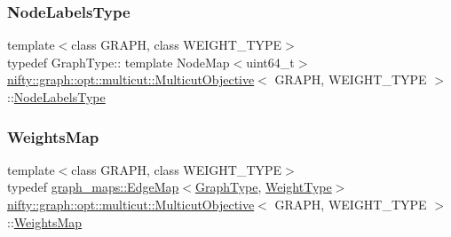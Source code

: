 \subsubsection{\texorpdfstring{Node\+Labels\+Type}{NodeLabelsType}}
{\footnotesize\ttfamily template$<$class G\+R\+A\+PH, class W\+E\+I\+G\+H\+T\+\_\+\+T\+Y\+PE$>$ \\
typedef Graph\+Type\+:: template Node\+Map$<$uint64\+\_\+t$>$ \hyperlink{classnifty_1_1graph_1_1opt_1_1multicut_1_1MulticutObjective}{nifty\+::graph\+::opt\+::multicut\+::\+Multicut\+Objective}$<$ G\+R\+A\+PH, W\+E\+I\+G\+H\+T\+\_\+\+T\+Y\+PE $>$\+::\hyperlink{classnifty_1_1graph_1_1opt_1_1multicut_1_1MulticutObjective_ade78c0dcabc90473c11c36dcbed3c157}{Node\+Labels\+Type}}

\mbox{\label{classnifty_1_1graph_1_1opt_1_1multicut_1_1MulticutObjective_aa893b1c13cb7add0c87445a1ed24d214}} 
\subsubsection{\texorpdfstring{Weights\+Map}{WeightsMap}}
{\footnotesize\ttfamily template$<$class G\+R\+A\+PH, class W\+E\+I\+G\+H\+T\+\_\+\+T\+Y\+PE$>$ \\
typedef \hyperlink{structnifty_1_1graph_1_1graph__maps_1_1EdgeMap}{graph\+\_\+maps\+::\+Edge\+Map}$<$\hyperlink{classnifty_1_1graph_1_1opt_1_1multicut_1_1MulticutObjective_a542786fae244388460be05f98396f864}{Graph\+Type}, \hyperlink{classnifty_1_1graph_1_1opt_1_1multicut_1_1MulticutObjective_a958d4c547cb186fb4d7af5e664027a16}{Weight\+Type}$>$ \hyperlink{classnifty_1_1graph_1_1opt_1_1multicut_1_1MulticutObjective}{nifty\+::graph\+::opt\+::multicut\+::\+Multicut\+Objective}$<$ G\+R\+A\+PH, W\+E\+I\+G\+H\+T\+\_\+\+T\+Y\+PE $>$\+::\hyperlink{classnifty_1_1graph_1_1opt_1_1multicut_1_1MulticutObjective_aa893b1c13cb7add0c87445a1ed24d214}{Weights\+Map}}

\mbox{\label{classnifty_1_1graph_1_1opt_1_1multicut_1_1MulticutObjective_a958d4c547cb186fb4d7af5e664027a16}} 
